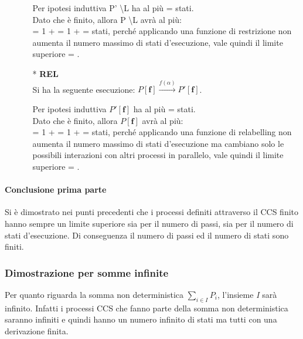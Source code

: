 \begin{itemize}
\begin{itemize}
		Per ipotesi induttiva  P' \textbackslash L ha al più  =  stati. \\
		Dato che  è finito, allora P \textbackslash L avrà al più: \\
		 = 1 +  = 1 +  =  stati, perché applicando una funzione di restrizione non aumenta il numero massimo di stati d'esecuzione, vale quindi il limite superiore  = .
			\\
		\item[*] \textbf{REL}
		\\
		Si ha la seguente esecuzione: $P \mathbf{[f]} \overset{f(\alpha)}\rightarrow P'\mathbf{[f]}$. 
		
		Per ipotesi induttiva  $P'\mathbf{[f]}$ ha al più  =  stati. \\
		Dato che  è finito, allora $P \mathbf{[f]}$ avrà al più: \\
		 = 1 +  = 1 +  =  stati, perché applicando una funzione di relabelling non aumenta il numero massimo di stati d'esecuzione ma cambiano solo le possibili interazioni con altri processi in parallelo, vale quindi il limite superiore  = .
		
	\end{itemize}
\end{itemize}

\paragraph{Conclusione prima parte} \mbox{}

Si è dimostrato nei punti precedenti che i processi definiti attraverso il CCS finito hanno sempre un limite superiore sia per il numero di passi, sia per il numero di stati d'esecuzione. Di conseguenza il numero di passi ed il numero di stati sono finiti.

\subsubsection{Dimostrazione per somme infinite}
Per quanto riguarda la somma non deterministica $\displaystyle\sum_{i\in I}^{}P_{i}$, l'insieme \textit{I} sarà infinito. Infatti i processi CCS che fanno parte della somma non deterministica saranno infiniti e quindi hanno un numero infinito di stati ma tutti con una derivazione finita.

